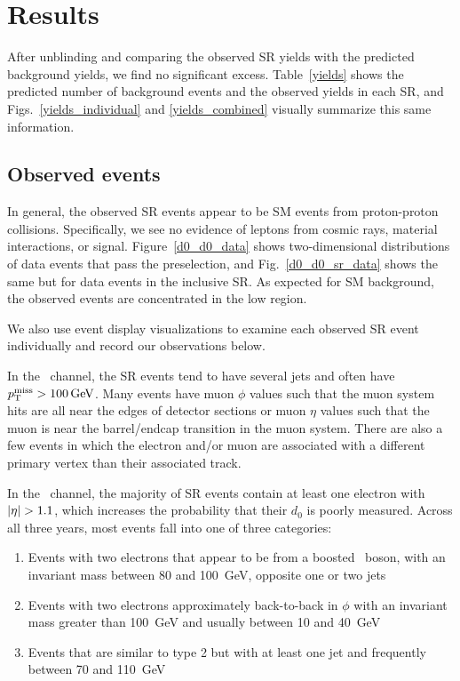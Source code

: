 \section{Results}
\label{results}
After unblinding and comparing the observed SR yields with the predicted background yields, we find no significant excess. Table~\ref{yields} shows the predicted number of background events and the observed yields in each SR, and Figs.~\ref{yields_individual} and \ref{yields_combined} visually summarize this same information. 




\subsection{Observed events}
In general, the observed SR events appear to be SM events from proton-proton collisions. Specifically, we see no evidence of leptons from cosmic rays, material interactions, or signal.  Figure~\ref{d0_d0_data} shows two-dimensional \ad distributions of data events that pass the preselection, and Fig.~\ref{d0_d0_sr_data} shows the same but for data events in the inclusive SR. As expected for SM background, the observed events are concentrated in the low \ad region.



We also use event display visualizations to examine each observed SR event individually and record our observations below.

In the \Pe\Pgm\ channel, the SR events tend to have several jets and often have $\ptmiss>\SI{100}{\GeV}$. Many events have muon $\phi$ values such that the muon system hits are all near the edges of detector sections or muon $\eta$ values such that the muon is near the barrel/endcap transition in the muon system. There are also a few events in which the electron and/or muon are associated with a different primary vertex than their associated track.

In the \Pe\Pe\ channel, the majority of SR events contain at least one electron with $\lvert \eta \rvert > 1.1$, which increases the probability that their $d_0$ is poorly measured. Across all three years, most events fall into one of three categories: 
\begin{enumerate}
    \itemsep0em
    \item Events with two electrons that appear to be from a boosted \cPZ\ boson, with an invariant mass between \num{80} and \SI{100}{\GeV}, opposite one or two jets
    \item Events with two electrons approximately back-to-back in $\phi$ with an invariant mass greater than \SI{100}{\GeV} and \ptmiss usually between \num{10} and \SI{40}{\GeV}
    \item Events that are similar to type 2 but with at least one jet and frequently \ptmiss between \num{70} and \SI{110}{\GeV}
\end{enumerate}


